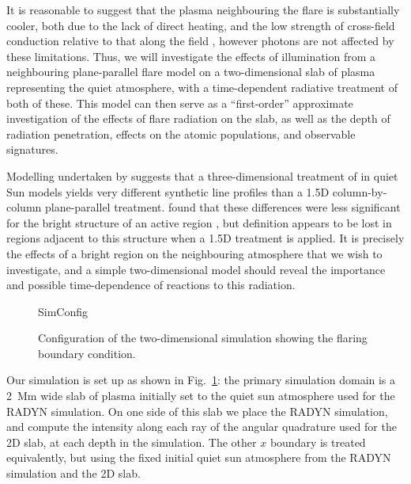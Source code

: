 It is reasonable to suggest that the plasma neighbouring the flare is substantially cooler, both due to the lack of direct heating, and the low strength of cross-field conduction relative to that along the field \citep{Spitzer1953}, however photons are not affected by these limitations.
Thus, we will investigate the effects of illumination from a neighbouring plane-parallel flare model on a two-dimensional slab of plasma representing the quiet atmosphere, with a time-dependent radiative treatment of both of these.
This model can then serve as a ``first-order'' approximate investigation of the effects of flare radiation on the slab, as well as the depth of radiation penetration, effects on the atomic populations, and observable signatures.

Modelling undertaken by \citet{Leenaarts2012a} suggests that a three-dimensional treatment of \Ha{} in quiet Sun models yields very different synthetic line profiles than a 1.5D column-by-column plane-parallel treatment.
\citet{Bjorgen2019} found that these differences were less significant for the bright structure of an active region \citep[based on the simulations of][]{Cheung2019}, but definition appears to be lost in regions adjacent to this structure when a 1.5D treatment is applied.
It is precisely the effects of a bright region on the neighbouring atmosphere that we wish to investigate, and a simple two-dimensional model should reveal the importance and possible time-dependence of reactions to this radiation.

\begin{figure}[tbp]
\centering
{SimConfig}
\caption{Configuration of the two-dimensional simulation showing the flaring boundary condition.}
\label{Fig:2DSimConfig}
\end{figure}

Our simulation is set up as shown in Fig.~\ref{Fig:2DSimConfig}: the primary simulation domain is a \SI{2}{\mega\metre} wide slab of plasma initially set to the quiet sun atmosphere used for the RADYN simulation.
On one side of this slab we place the RADYN simulation, and compute the intensity along each ray of the angular quadrature used for the 2D slab, at each depth in the simulation.
The other $x$ boundary is treated equivalently, but using the fixed initial quiet sun atmosphere from the RADYN simulation and the 2D slab.

